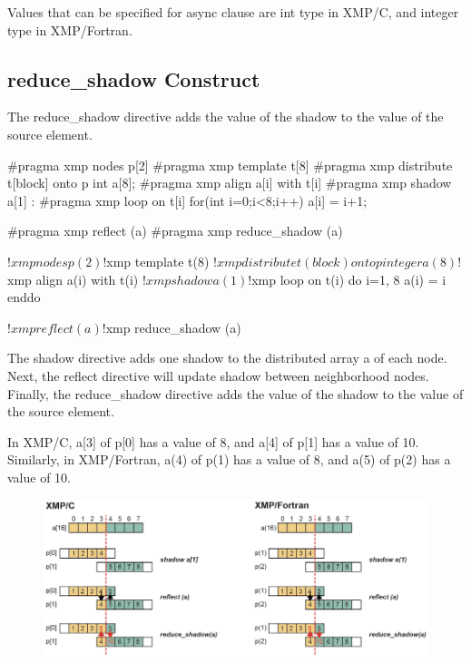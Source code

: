 \begin{mynote}
Values that can be specified for async clause are
int type in XMP/C, and
integer type in XMP/Fortran.
\end{mynote}

\subsection{{\bf reduce\_shadow} Construct}

The reduce\_shadow directive adds the value of the shadow to the value of
the source element.

\begin{XCexample}
#pragma xmp nodes p[2]
#pragma xmp template t[8]
#pragma xmp distribute t[block] onto p
int a[8];
#pragma xmp align a[i] with t[i]
#pragma xmp shadow a[1]
 :
#pragma xmp loop on t[i]
  for(int i=0;i<8;i++)
    a[i] = i+1;

#pragma xmp reflect (a)
#pragma xmp reduce_shadow (a)
\end{XCexample}

\begin{XFexample}
!$xmp nodes p(2)
!$xmp template t(8)
!$xmp distribute t(block) onto p
  integer a(8)
!$xmp align a(i) with t(i)
!$xmp shadow a(1)

!$xmp loop on t(i)
  do i=1, 8
    a(i) = i
  enddo

!$xmp reflect (a)
!$xmp reduce_shadow (a)
\end{XFexample}

The shadow directive adds one shadow to the distributed array a of each
node. Next, the reflect directive will update shadow between
neighborhood nodes. Finally, the reduce\_shadow directive adds the value
of the shadow to the value of the source element.

In XMP/C, a[3] of p[0] has a value of 8, and a[4] of p[1] has a value of
10. Similarly, in XMP/Fortran, a(4) of p(1) has a value of 8, and a(5)
of p(2) has a value of 10.

\begin{figure}
  \centering
  \includegraphics{figs/reduce_shadow.png}
\end{figure}

